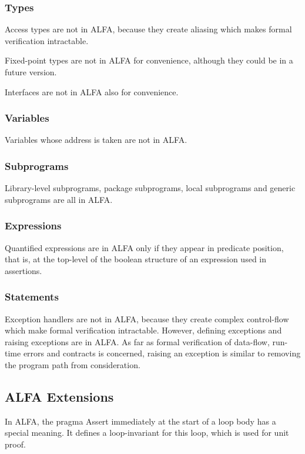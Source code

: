 \documentclass{article}
\begin{document}
\subsubsection{Types}

Access types are not in ALFA, because they create aliasing which makes formal
verification intractable.

Fixed-point types are not in ALFA for convenience, although they could be in a
future version.

Interfaces are not in ALFA also for convenience.

\subsubsection{Variables}

Variables whose address is taken are not in ALFA.

\subsubsection{Subprograms}

Library-level subprograms, package subprograms, local subprograms and generic
subprograms are all in ALFA.

\subsubsection{Expressions}

Quantified expressions are in ALFA only if they appear in predicate position,
that is, at the top-level of the boolean structure of an expression used in
assertions.

\subsubsection{Statements}

Exception handlers are not in ALFA, because they create complex control-flow
which make formal verification intractable. However, defining exceptions and
raising exceptions are in ALFA. As far as formal verification of data-flow,
run-time errors and contracts is concerned, raising an exception is similar to
removing the program path from consideration.

\subsection{ALFA Extensions}

In ALFA, the pragma Assert immediately at the start of a loop body has a
special meaning. It defines a loop-invariant for this loop, which is used for
unit proof.
\end{document}
